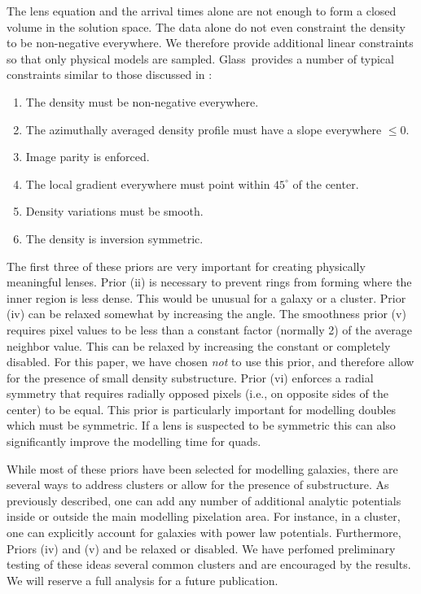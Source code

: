 \documentclass[galley,usenatbib]{mn2e}
\newcommand{\Glass}{{\sc Glass}}
\begin{document}
The lens equation and the arrival times alone are not enough to form a closed
volume in the solution space. The data alone do not even constraint the density
to be non-negative everywhere. We therefore provide additional linear
constraints so that only physical models are sampled. 
\Glass\ provides a number of typical constraints similar to those discussed in
\cite{2008ApJ...679...17C}: 
%
\begin{enumerate}
\item The density must be non-negative everywhere.
\item The azimuthally averaged density profile must have a slope everywhere $\le 0$.
\item Image parity is enforced.
\item The local gradient everywhere must point within $45^{\circ}$ of the center.
\item Density variations must be smooth.
\item The density is inversion symmetric.
\end{enumerate}

The first three of these priors are very important for creating physically
meaningful lenses. Prior (ii) is necessary to prevent rings from forming where
the inner region is less dense. This would be unusual for a galaxy or a
cluster. Prior (iv) can be relaxed somewhat by increasing the angle. The
smoothness prior (v) requires pixel values to be less than a constant factor
(normally 2) of the average neighbor value. This can be relaxed by increasing
the constant or completely disabled. For this paper, we have chosen \emph{not}
to use this prior, and therefore allow for the presence of small density
substructure.  Prior (vi) enforces a radial symmetry that requires radially
opposed pixels (i.e., on opposite sides of the center) to be equal. This prior
is particularly important for modelling doubles which must be symmetric. If a
lens is suspected to be symmetric this can also significantly improve the
modelling time for quads.

While most of these priors have been selected for modelling galaxies, there
are several ways to address clusters or allow for the presence of substructure.
As previously described, one can add any number of additional analytic 
potentials inside or outside the main modelling pixelation area. For instance,
in a cluster, one can explicitly account for galaxies with power law potentials.
Furthermore, Priors (iv) and (v) and be relaxed or disabled. We have perfomed
preliminary testing of these ideas several common clusters and are encouraged
by the results. We will reserve a full analysis for a future publication.
\end{document}
